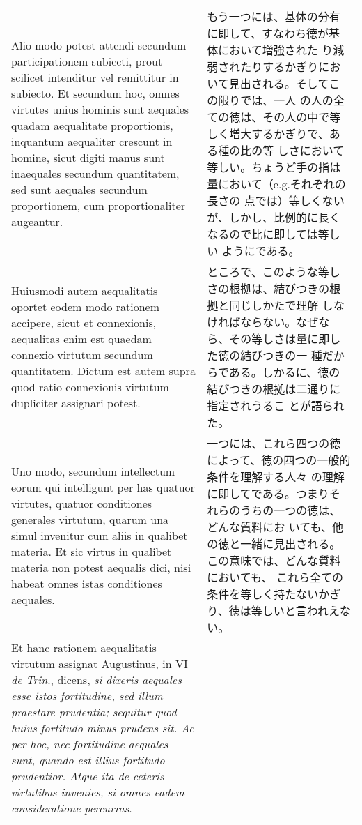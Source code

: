 \documentclass[10pt]{jsarticle}
\begin{document}
\begin{longtable}{p{21em}p{21em}}
\\


 Alio modo potest attendi secundum participationem subiecti, prout
 scilicet intenditur vel remittitur in subiecto. Et secundum hoc,
 omnes virtutes unius hominis sunt aequales quadam aequalitate
 proportionis, inquantum aequaliter crescunt in homine, sicut digiti
 manus sunt inaequales secundum quantitatem, sed sunt aequales
 secundum proportionem, cum proportionaliter augeantur.

&

 もう一つには、基体の分有に即して、すなわち徳が基体において増強された
 り減弱されたりするかぎりにおいて見出される。そしてこの限りでは、一人
 の人の全ての徳は、その人の中で等しく増大するかぎりで、ある種の比の等
 しさにおいて等しい。ちょうど手の指は量において（e.g.それぞれの長さの
 点では）等しくないが、しかし、比例的に長くなるので比に即しては等しい
 ようにである。

\\


 Huiusmodi autem aequalitatis oportet eodem modo rationem accipere,
 sicut et connexionis, aequalitas enim est quaedam connexio virtutum
 secundum quantitatem. Dictum est autem supra quod ratio connexionis
 virtutum dupliciter assignari potest.

&

 ところで、このような等しさの根拠は、結びつきの根拠と同じしかたで理解
 しなければならない。なぜなら、その等しさは量に即した徳の結びつきの一
 種だからである。しかるに、徳の結びつきの根拠は二通りに指定されうるこ
 とが語られた。

\\


 Uno modo, secundum intellectum eorum qui intelligunt per has quatuor
 virtutes, quatuor conditiones generales virtutum, quarum una simul
 invenitur cum aliis in qualibet materia. Et sic virtus in qualibet
 materia non potest aequalis dici, nisi habeat omnes istas conditiones
 aequales.



 
&

 一つには、これら四つの徳によって、徳の四つの一般的条件を理解する人々
 の理解に即してである。つまりそれらのうちの一つの徳は、どんな質料にお
 いても、他の徳と一緒に見出される。この意味では、どんな質料においても、
 これら全ての条件を等しく持たないかぎり、徳は等しいと言われえない。

\\


Et hanc rationem aequalitatis virtutum assignat Augustinus, in VI
 {\itshape de Trin}., dicens, {\itshape si dixeris aequales esse istos
 fortitudine, sed illum praestare prudentia; sequitur quod huius
 fortitudo minus prudens sit. Ac per hoc, nec fortitudine aequales
 sunt, quando est illius fortitudo prudentior. Atque ita de ceteris
 virtutibus invenies, si omnes eadem consideratione percurras}.


\end{longtable}
\end{document}
